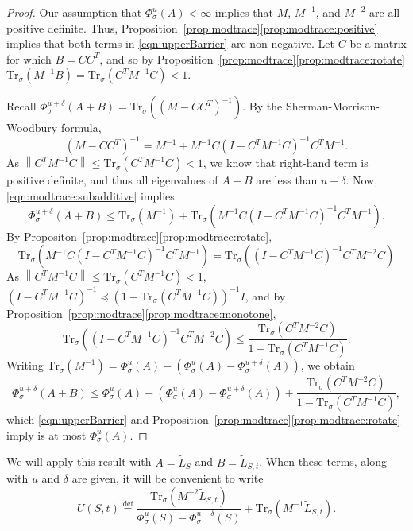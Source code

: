 \documentclass[11pt]{article}
\def\Ltil{\widetilde{L}}
\def\norm#1{\left\| #1 \right\|}
\def\pleq{\preccurlyeq}
\def\defeq{\stackrel{\mathrm{def}}{=}}
\def\trs#1{\mathrm{Tr}_{\sigma} \left(#1 \right)}
\begin{document}
\begin{proof}
Our assumption that $\Phi^{u}_{\sigma} (A) < \infty$ implies that 
  $M$, $M^{-1}$, and $M^{-2}$ are all positive definite.
Thus, Proposition~\ref{prop:modtrace}\ref{prop:modtrace:positive} implies that both terms in \eqref{eqn:upperBarrier} are non-negative.
Let $C$ be a matrix for which  $B = C C^T$,
  and so by
 Proposition~\ref{prop:modtrace}\ref{prop:modtrace:rotate}
   $\trs{M^{-1} B} = \trs{C^T M^{-1} C} < 1$.

Recall $\Phi^{u+\delta}_{\sigma} (A + B) 
=  
\trs{(M - C C^T)^{-1}}.$
By the Sherman-Morrison-Woodbury formula, 
\[ 
(M - C C^T)^{-1} 
= 
M^{-1} + M^{-1} C (I - C^T M^{-1} C)^{-1} C^T M^{-1}.
\]
As $\norm{C^T M^{-1} C} \leq \trs{C^T M^{-1} C} < 1$, we know that right-hand term is positive definite, and thus all eigenvalues of $A+B$ are less than $u + \delta$.
Now, \eqref{eqn:modtrace:subadditive} implies 
\[
\Phi^{u+\delta}_{\sigma} (A + B) 
\leq 
\trs{M^{-1}} + \trs{M^{-1} C (I - C^T M^{-1} C)^{-1} C^T M^{-1}}.
\]
By Propositon~\ref{prop:modtrace}\ref{prop:modtrace:rotate},
\[
\trs{M^{-1} C (I - C^T M^{-1} C)^{-1} C^T M^{-1}} 
= 
\trs{ (I - C^T M^{-1} C)^{-1} C^T M^{-2} C}
\]
As $\norm{C^T M^{-1} C} \leq \trs{C^T M^{-1} C} < 1$,  
$(I - C^T M^{-1} C)^{-1} \pleq  (1 - \trs{C^T M^{-1} C})^{-1} I$, and 
by Proposition~\ref{prop:modtrace}\ref{prop:modtrace:monotone}, 
\[
\trs{ (I - C^T M^{-1} C)^{-1} C^T M^{-2} C}
\leq 
\frac{\trs{C^T M^{-2} C}}{1 - \trs{C^T M^{-1} C}}.
\]
Writing $\trs{M^{-1}} = \Phi^{u}_{\sigma} (A) - (\Phi^{u}_{\sigma} (A) - \Phi^{u+\delta}_{\sigma} (A))$, 
we obtain 
\[
\Phi^{u+\delta}_{\sigma} (A + B) 
\leq 
\Phi^{u}_{\sigma} (A) - (\Phi^{u}_{\sigma} (A) - \Phi^{u+\delta}_{\sigma} (A)) 
+ 
\frac{\trs{C^T M^{-2} C}}{1 - \trs{C^T M^{-1} C}},
\]
which \eqref{eqn:upperBarrier} and Proposition~\ref{prop:modtrace}\ref{prop:modtrace:rotate} imply is at most $\Phi^{u}_{\sigma} (A)$.
\end{proof}

We will apply this result with $A = \Ltil_{S}$ and $B = \Ltil_{S,t}$.
When these terms, along with $u$ and $\delta$ are given, 
it will be convenient to write 
\[
U (S,t) \defeq 
\frac{\trs{M^{-2} \Ltil_{S,t}}}
     {\Phi^{u}_{\sigma} (S) - \Phi^{u+\delta }_{\sigma} (S) }
     + \trs{M^{-1} \Ltil_{S,t}}.
\]
\end{document}
